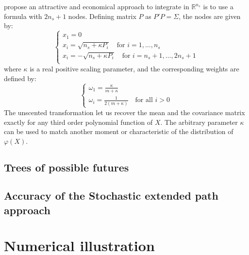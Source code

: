 \documentclass[a4paper,12pt]{amsart}
\begin{document}
\textcite{Julier2000} propose an attractive and economical approach to
integrate in $\mathbb R^{n_s}$ is to use a formula with \(2n_s + 1\)
nodes. Defining matrix $P$ as \(P'P=\Sigma\), the nodes are given by:
\[
  \begin{cases}
    x_1 = 0\\
    x_{i} = \sqrt{n_s+\kappa P_i}\quad\text{for }i=1,\dots,n_s\\
    x_{i} = -\sqrt{n_s+\kappa P_i}\quad\text{for }i=n_s+1,\dots,2n_s+1\\
  \end{cases}
\]
where $\kappa$ is a real positive scaling parameter, and the corresponding weights are defined by:
\[
  \begin{cases}
    \omega_1 = \frac{\kappa}{m+\kappa}\\
    \omega_i = \frac{1}{2(m+\kappa)}\quad\text{for all } i>0
  \end{cases}
\]
The unscented transformation let us recover the mean and the
covariance matrix exactly for any third order polynomial function
of $X$. The arbitrary parameter $\kappa$ can be used to match another
moment or characteristic of the distribution of $\varphi(X)$.\newline

\subsection{Trees of possible futures}

\subsection{Accuracy of the Stochastic extended path approach}

\section{Numerical illustration}\label{sec:3}
\end{document}
